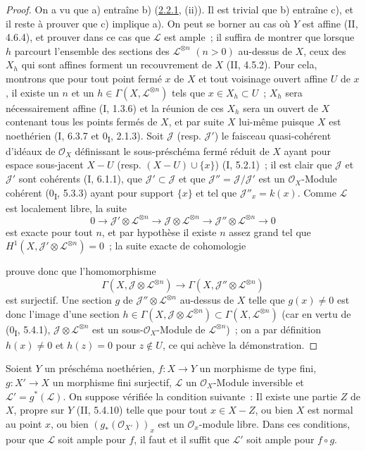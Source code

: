 \begin{proof}
On a vu que a) entraîne b) (\hyperref[III.2.2.1-fr]{2.2.1}, (ii)). Il
est trivial que b) entraîne c), et il reste à prouver que c) implique
a). On peut se borner au cas où $Y$ est affine (II, 4.6.4), et prouver
dans ce cas que $\mathcal L$ est ample~; il suffira de montrer que lorsque
$h$ parcourt l'ensemble des sections des $\mathcal L^{\otimes n}$
$(n>0)$ au-dessus de $X$, ceux des $X_h$ qui sont affines forment un
recouvrement de $X$ (II, 4.5.2). Pour cela, montrons que pour tout point
fermé $x$ de $X$ et tout voisinage ouvert affine $U$ de $x$, il existe un
$n$ et un $h\in\Gamma(X,\mathcal L^{\otimes n})$ tels que
$x\in X_h\subset U$~; $X_h$ sera nécessairement affine (I, 1.3.6) et la
réunion de ces $X_h$ sera un ouvert de $X$ contenant tous les points
fermés de $X$, et par suite $X$ lui-même puisque $X$ est noethérien
(I, 6.3.7 et 0\textsubscript{I}, 2.1.3). Soit $\mathcal J$ (resp.
$\mathcal J'$) le faisceau quasi-cohérent d'idéaux de $\mathcal O_X$
définissant le sous-préschéma fermé réduit de $X$ ayant pour espace
sous-jacent $X-U$ (resp. $(X-U)\cup\{x\}$) (I, 5.2.1)~; il est clair que
$\mathcal J$ et $\mathcal J'$ sont cohérents (I, 6.1.1), que
$\mathcal J'\subset\mathcal J$ et que
$\mathcal J''=\mathcal J/\mathcal J'$ est un $\mathcal O_X$-Module
cohérent (0\textsubscript{I}, 5.3.3) ayant pour support $\{x\}$ et tel
que $\mathcal J''_x=k(x)$. Comme $\mathcal L$ est localement libre, la
suite
\[
0\to\mathcal J'\otimes\mathcal L^{\otimes n}
\to\mathcal J\otimes\mathcal L^{\otimes n}
\to\mathcal J''\otimes\mathcal L^{\otimes n}\to0
\]
est exacte pour tout $n$, et par hypothèse il existe $n$ assez grand tel
que $H^1(X,\mathcal J'\otimes\mathcal L^{\otimes n})=0$~; la suite
exacte de cohomologie

prouve donc que l'homomorphisme
\[
\Gamma(X,\mathcal J\otimes\mathcal L^{\otimes n})
\longrightarrow
\Gamma(X,\mathcal J''\otimes\mathcal L^{\otimes n})
\]
est surjectif. Une section $g$ de
$\mathcal J''\otimes\mathcal L^{\otimes n}$ au-dessus de $X$ telle que
$g(x)\neq0$ est donc l'image d'une section
$h\in\Gamma(X,\mathcal J\otimes\mathcal L^{\otimes n})
\subset\Gamma(X,\mathcal L^{\otimes n})$ (car en vertu de
(0\textsubscript{I}, 5.4.1),
$\mathcal J\otimes\mathcal L^{\otimes n}$ est un sous-$\mathcal O_X$-Module
de $\mathcal L^{\otimes n}$)~; on a par définition $h(x)\neq0$ et
$h(z)=0$ pour $z\notin U$, ce qui achève la démonstration.
\end{proof}

\begin{proposition}[2.6.2]
\label{III.2.6.2-fr}
Soient $Y$ un préschéma noethérien, $f:X\to Y$ un morphisme de type
fini, $g:X'\to X$ un morphisme fini surjectif, $\mathcal L$ un
$\mathcal O_X$-Module inversible et $\mathcal L'=g^*(\mathcal L)$. On
suppose vérifiée la condition suivante~: Il existe une partie $Z$ de
$X$, propre sur $Y$ (II, 5.4.10) telle que pour tout $x\in X-Z$, ou bien
$X$ est normal au point $x$, ou bien $(g_*(\mathcal O_{X'}))_x$ est un
$\mathcal O_x$-module libre. Dans ces conditions, pour que $\mathcal L$
soit ample pour $f$, il faut et il suffit que $\mathcal L'$ soit ample
pour $f\circ g$.
\end{proposition}

